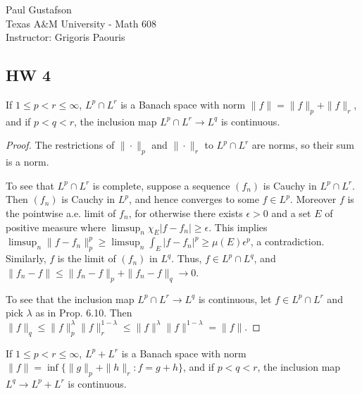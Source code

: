 \documentclass{article}
\begin{document}
\noindent Paul Gustafson\\
\noindent Texas A\&M University - Math 608 \\ 
\noindent Instructor: Grigoris Paouris

\subsection*{HW 4}
 If $1 \le p < r \le \infty$, $L^p \cap L^r$ is a Banach space with norm $\|f\| = \|f\|_p + \|f\|_r$, and if 
$p < q< r$, the inclusion map $L^p \cap L^r \to L^q$ is continuous.
\begin{proof}
The restrictions of $\|\cdot\|_p$ and $\|\cdot\|_r$ to $L^p \cap L^r$ are norms, so their sum is a norm. 

 To see that $L^p \cap L^r$ is complete, suppose a sequence $(f_n)$ is Cauchy in $L^p \cap L^r$.  Then $(f_n)$ is Cauchy in $L^p$, and hence converges to some $f \in L^p$.  Moreover $f$ is the pointwise a.e. limit of $f_n$, for otherwise there exists $\epsilon > 0$ and a set $E$ of positive measure where $\limsup_n \chi_E |f - f_n| \ge \epsilon$. This implies $\limsup_n \|f - f_n\|_p^p \ge \limsup_n \int_E |f - f_n|^p \ge \mu(E) \epsilon^p$, a contradiction. Similarly, $f$ is the limit of $(f_n)$ in $L^q$.  Thus, $f \in L^p \cap L^q$, and $\|f_n - f\| \le \|f_n -f\|_p + \|f_n - f\|_q \to 0$.

To see that the inclusion map $L^p \cap L^r \to L^q$ is continuous, let $f \in L^p \cap L^r$ and pick $\lambda$ as in Prop. 6.10.  Then $\|f\|_q \le \|f\|_p^\lambda \|f\|_r^{1 - \lambda} \le \|f\|^\lambda \|f\|^{1 - \lambda} = \|f\|$.
\end{proof}

 If $1 \le p < r \le \infty$, $L^p + L^r$ is a Banach space with norm $\|f\| = \inf\{\|g\|_p + \|h\|_r : f = g + h\}$, and if
$p < q < r$, the inclusion map $L^q \to L^p + L^r$ is continuous.
\end{document}
